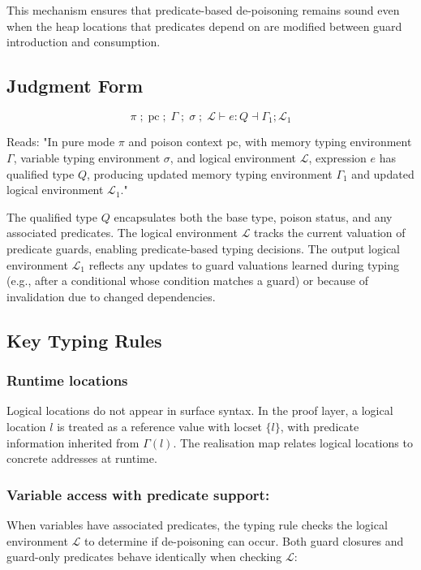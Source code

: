 \documentclass[12pt]{article}
\begin{document}
This mechanism ensures that predicate-based de-poisoning remains sound even when
the heap locations that predicates depend on are modified between guard introduction
and consumption.

\subsection{Judgment Form}

\[
\pi \; ;\; \text{pc} \; ;\; \Gamma \; ;\; \sigma \; ;\; \mathcal{L} \vdash e : Q \dashv \Gamma_1 ; \mathcal{L}_1
\]

Reads: "In pure mode $\pi$ and poison context $\text{pc}$, with memory typing environment $\Gamma$,
variable typing environment $\sigma$, and logical environment $\mathcal{L}$,
expression $e$ has qualified type $Q$, producing updated memory typing
environment $\Gamma_1$ and updated logical environment $\mathcal{L}_1$."

The qualified type $Q$ encapsulates both the base type, poison status, and any
associated predicates. The logical environment $\mathcal{L}$ tracks the current
valuation of predicate guards, enabling predicate-based typing decisions. The
output logical environment $\mathcal{L}_1$ reflects any updates to guard
valuations learned during typing (e.g., after a conditional whose condition
matches a guard) or
because of invalidation due to changed dependencies.

\subsection{Key Typing Rules}

\subsubsection*{Runtime locations}
Logical locations do not appear in surface syntax. In the proof layer, a logical
location $l$ is treated as a reference value with locset $\{l\}$, with predicate
information inherited from $\Gamma(l)$. The realisation map relates logical
locations to concrete addresses at runtime.

\subsubsection*{Variable access with predicate support:}
When variables have associated predicates, the typing rule checks the logical environment $\mathcal{L}$ to determine if de-poisoning can occur. Both guard closures and guard-only predicates behave identically when checking $\mathcal{L}$:
\end{document}
